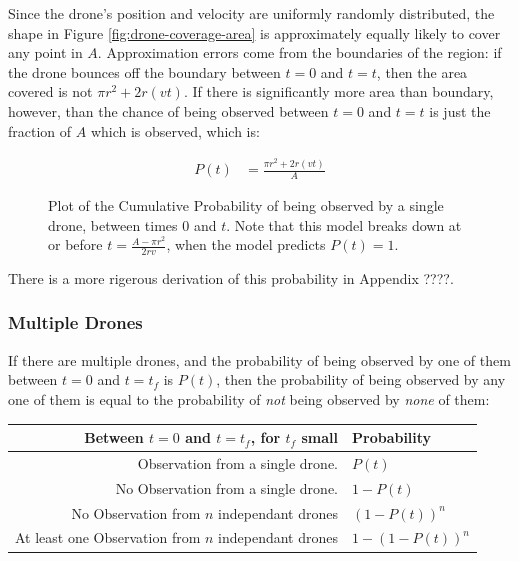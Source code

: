 \documentclass{article}
\begin{document}
Since the drone's position and velocity are uniformly randomly distributed,
	the shape in Figure \ref{fig:drone-coverage-area} is approximately equally likely to 
	cover any point in $A$.	
Approximation errors come from the boundaries of the region: if the drone bounces
	off the boundary between $t=0$ and $t=t$, then the area covered is not
	$\pi r^2 + 2 r (v t)$.
If there is significantly more area than boundary, however, than the chance of being 
	observed between $t=0$ and $t=t$ is just the fraction of $A$ which is observed,
	which is:

\begin{align}
P(t) & = \frac{\pi r^2 + 2 r (v t)}{A}
\end{align}

\begin{figure}[h!]
\begin{centering}
\label{fig:p-plot}
\caption{Plot of the Cumulative Probability of being observed by a single drone,
between times $0$ and $t$.
Note that this model breaks down at or before $t = \frac{ A - \pi r^2 }{2 r v}$,
	when the model predicts $P(t) = 1$.}
\end{centering}
\end{figure}

There is a more rigerous derivation of this probability in Appendix ????.

\subsubsection{Multiple Drones}

If there are multiple drones, and the probability of being observed by one of them between
	$t=0$ and $t=t_f$ is $P(t)$, then the probability of being observed by any one of them
	is equal to the probability of \emph{not} being observed by \emph{none} of them:

\begin{tabular}{r|l}
Between $t = 0$ and $t = t_f$, for $t_f$ small & Probability \\
\hline
Observation from a single drone. & $P(t)$\\
No Observation from a single drone. & $1 - P(t)$ \\
No Observation from $n$ independant drones & $\left(1 - P(t)\right)^n$\\
At least one Observation from $n$ independant drones 
	& $1 - \left( 1 - P(t) \right)^n$\\
\end{tabular}
\end{document}
